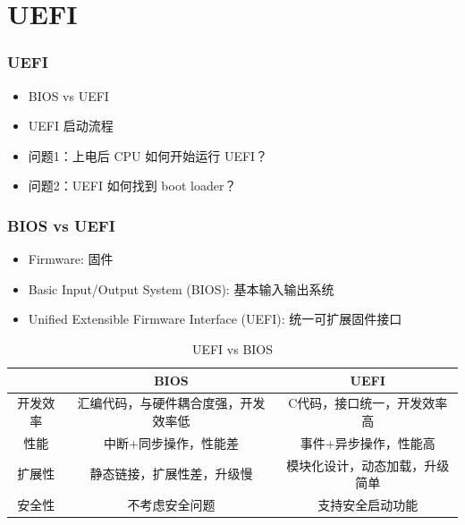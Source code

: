 \documentclass{beamer}
\begin{document}
\section{UEFI}

\begin{frame}
    \frametitle{UEFI}

    \begin{itemize}
        \item BIOS vs UEFI
        \item UEFI 启动流程
        \item 问题1：上电后 CPU 如何开始运行 UEFI？
        \item 问题2：UEFI 如何找到 boot loader？
    \end{itemize}
\end{frame}

\begin{frame}
    \frametitle{BIOS vs UEFI}
    \begin{itemize}
        \item Firmware: 固件
        \item Basic Input/Output System (BIOS): 基本输入输出系统
        \item Unified Extensible Firmware Interface (UEFI): 统一可扩展固件接口
    \end{itemize}

    \begin{table}
    \footnotesize
    \begin{center}
    \begin{tabular}{|c|c|c|}
    \hline
     & BIOS & UEFI \\ \hline
    开发效率 & 汇编代码，与硬件耦合度强，开发效率低 & C代码，接口统一，开发效率高 \\ \hline
    性能 & 中断+同步操作，性能差 & 事件+异步操作，性能高 \\ \hline
    扩展性 & 静态链接，扩展性差，升级慢 & 模块化设计，动态加载，升级简单 \\ \hline
    安全性 & 不考虑安全问题 & 支持安全启动功能 \\ \hline
    \end{tabular}
    \end{center}
    \caption{UEFI vs BIOS}
    \end{table}

\end{frame}
\end{document}
